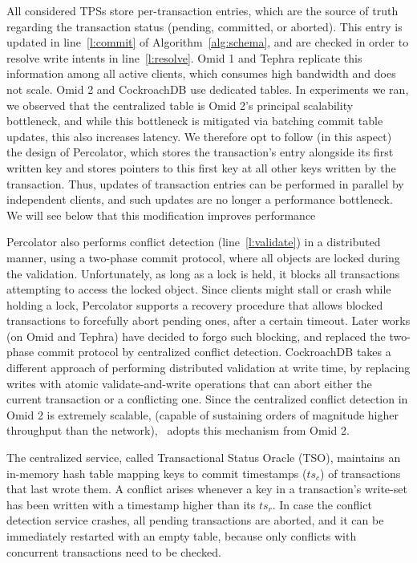 All considered TPSs store per-transaction entries, which are the source of truth regarding the transaction status (pending, committed, or aborted). 
This entry is updated in line~\ref{l:commit} of Algorithm~\ref{alg:schema}, and are checked in order to resolve write intents in line~\ref{l:resolve}.
Omid 1 and Tephra replicate this information among all active clients, which consumes high bandwidth and does not scale. Omid 2 and 
CockroachDB use dedicated tables. In experiments we ran, we observed that the centralized table is Omid 2's principal scalability bottleneck, and while this bottleneck is mitigated via batching commit table updates, this also increases latency. 
We therefore opt to follow (in this aspect) the design of Percolator, which stores the transaction's entry alongside its first written key and stores pointers to this first key at all other keys written by the transaction. Thus, updates of transaction entries can be performed in parallel by 
independent clients, and such updates are no longer a performance bottleneck. 
We will see below that this modification improves performance 

Percolator also performs conflict detection (line~\ref{l:validate}) in a distributed manner, using a two-phase commit protocol, where all objects are locked during the validation.  Unfortunately, as long as a lock is held, it blocks all transactions attempting to access the locked object. Since clients might stall or 
crash while holding a lock, Percolator supports a recovery procedure that allows blocked transactions to forcefully abort pending ones, 
after a certain timeout. Later works (on Omid and Tephra) have decided to forgo such blocking, and replaced the two-phase commit protocol by 
centralized conflict detection. CockroachDB takes a different approach of performing distributed validation at write time, by replacing writes with atomic validate-and-write operations that can abort either the current transaction or a conflicting one. Since the centralized conflict detection in Omid 2 is extremely scalable, (capable of sustaining orders of magnitude higher throughput than the network), 
\sys\ adopts this mechanism from Omid 2. 

The centralized service, called Transactional Status Oracle (TSO), maintains an in-memory hash table mapping keys to 
commit timestamps ($ts_c$) of transactions that last wrote them. A conflict arises whenever a key in a transaction's write-set has been written 
with a timestamp higher than its $ts_r$. 
In case the conflict detection service crashes, all pending transactions are aborted, and it can be immediately restarted with an empty table, because only conflicts with concurrent transactions need to be checked. 

